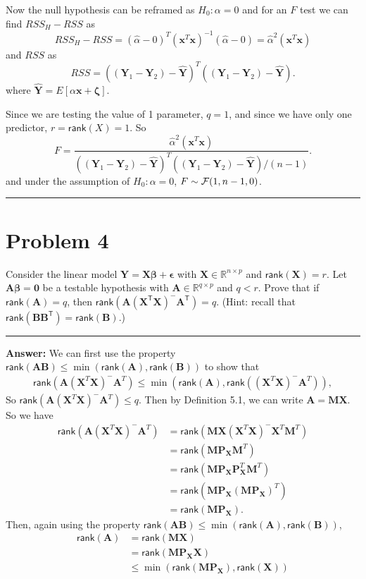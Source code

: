 \documentclass[
]{article}
\newcommand{\bmA}{\ensuremath{\bm A}}
\newcommand{\bmB}{\ensuremath{\bm B}}
\newcommand{\bmM}{\ensuremath{\bm M}}
\newcommand{\bmP}{\ensuremath{\bm P}}
\newcommand{\bmX}{\ensuremath{\bm X}}
\newcommand{\bmx}{\ensuremath{\bm x}}
\newcommand{\bmY}{\ensuremath{\bm Y}}
\newcommand{\bmbeta}{\ensuremath{\bm{\beta}}}
\newcommand{\bmepsilon}{\ensuremath{\bm{\epsilon}}}
\newcommand{\bmzeta}{\ensuremath{\bm{\zeta}}}
\newcommand{\rank}{\ensuremath{\mathsf{rank}}}
\newcommand{\mT}{\ensuremath{\mathsf{T}}}
\newcommand{\XtX}{\ensuremath{\bmX^\mT\bmX}}
\begin{document}
Now the null hypothesis can be reframed as \(H_0: \alpha = 0\) and for
an \(F\) test we can find \(RSS_H - RSS\) as \[
RSS_H - RSS = (\hat{\alpha} - 0 )^T(\bmx^T\bmx)^{-1}(\hat{\alpha} - 0) = \hat{\alpha}^2(\bmx^T\bmx)
\] and \(RSS\) as \[
RSS = ((\bmY_1 - \bmY_2) - \hat{\bmY})^T((\bmY_1 - \bmY_2) - \hat{\bmY}).
\] where \(\hat{\bmY} = E[\alpha\bmx + \bmzeta]\).

Since we are testing the value of 1 parameter, \(q=1\), and since we
have only one predictor, \(r = \rank(X) = 1\). So
\[F = \frac{\hat{\alpha}^2(\bmx^T\bmx)}{((\bmY_1 - \bmY_2) - \hat{\bmY})^T((\bmY_1 - \bmY_2) - \hat{\bmY})/(n-1)}.\]
and under the assumption of \(H_0: \alpha = 0\),
\(F \sim {\cal F}(1, n-1, 0)\).

\begin{center}\rule{0.5\linewidth}{0.5pt}\end{center}

\hypertarget{problem-4}{%
\section{Problem 4}\label{problem-4}}

Consider the linear model \(\bmY = \bmX\bmbeta + \bmepsilon\) with
\(\bmX \in \mathbb{R}^{n \times p}\) and \(\rank(\bmX) = r\). Let
\(\bmA\bmbeta = \bm0\) be a testable hypothesis with
\(\bmA \in \mathbb{R}^{q \times p}\) and \(q < r\). Prove that if
\(\rank(\bmA) = q\), then \(\rank(\bmA(\XtX)^{-}\bmA^\mT) = q\). (Hint:
recall that \(\rank(\bmB\bmB^\mT) = \rank(\bmB)\).)

\begin{center}\rule{0.5\linewidth}{0.5pt}\end{center}

\textbf{Answer:} We can first use the property
\(\rank(\bmA\bmB) \leq \min(\rank(\bmA), \rank(\bmB))\) to show that
\begin{align*}
\rank(\bmA(\bmX^T\bmX)^- \bmA^T) \le \min(\rank(\bmA), \rank((\bmX^T\bmX)^- \bmA^T)),
\end{align*} So \(\rank(\bmA(\bmX^T\bmX)^- \bmA^T) \le q\). Then by
Definition 5.1, we can write \(\bmA = \bmM\bmX\). So we have
\begin{align*}
\rank(\bmA(\bmX^T\bmX)^- \bmA^T) &= \rank(\bmM\bmX (\bmX^T\bmX)^- \bmX^T \bmM^T) \\
&= \rank(\bmM \bmP_{\bmX} \bmM^T) \\
&= \rank(\bmM \bmP_{\bmX} \bmP_{\bmX}^T\bmM^T) \\
&= \rank(\bmM\bmP_{\bmX}(\bmM\bmP_{\bmX})^T) \\
&= \rank(\bmM\bmP_{\bmX}).
\end{align*} Then, again using the property
\(\rank(\bmA\bmB) \leq \min(\rank(\bmA), \rank(\bmB))\), \begin{align*}
\rank(\bmA) &= \rank(\bmM\bmX) \\
&= \rank(\bmM\bmP_{\bmX}\bmX) \\
&\leq \min(\rank(\bmM\bmP_{\bmX}), \rank(\bmX))
\end{align*}
\end{document}
